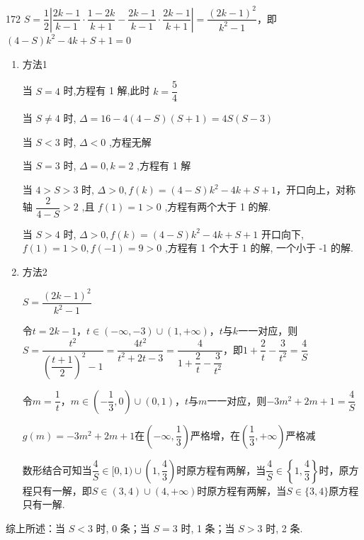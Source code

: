 \begin{enumerate}
\begin{jieda}
\begin{enumerate}
\begin{dingautolist}{172}
                $S = \dfrac{1}{2} \left|\dfrac{{2k} - 1}{k - 1} \cdot \dfrac{1 - {2k}}{k + 1} - \dfrac{{2k} - 1}{k - 1} \cdot \dfrac{{2k} - 1}{k + 1}\right| = \dfrac{{\left( 2k - 1\right) }^{2}}{{k}^{2} - 1}$，即 $\left( {4 - S}\right) {k}^{2} - {4k} + S + 1 = 0$
                \begin{enumerate}[1.]
                    \item 方法1 
                    
                    当 $S = 4$ 时,方程有 1 解,此时 $k = \dfrac{5}{4}$
                    
                    当 $S \neq  4$ 时, $\Delta  = {16} - 4\left( {4 - S}\right) \left( {S + 1}\right)  = {4S}\left( {S - 3}\right)$ 
                    
                    当 $S < 3$ 时, $\Delta  < 0$ ,方程无解
                    
                    当 $S = 3$ 时, $\Delta  = 0,k = 2$ ,方程有 1 解
                    
                    当 $4 > S > 3$ 时, $\Delta  > 0,f\left( k\right)  = \left( {4 - S}\right) {k}^{2} - {4k} + S + 1$，开口向上，对称轴 $\dfrac{2}{4 - S} > 2$ ,且 $f\left( 1\right)  = 1 > 0$ ,方程有两个大于 1 的解.
                    
                    当 $S > 4$ 时, $\Delta  > 0,f\left( k\right)  = \left( {4 - S}\right) {k}^{2} - {4k} + S + 1$ 开口向下, $f\left( 1\right)  = 1 > 0,f\left( {-1}\right)  = 9 > 0$ ,方程有 1 个大于 1 的解, 一个小于 -1 的解.
                    \item 方法2

                    $S = \dfrac{(2k-1)^2}{k^2-1}$
                    
                    令$t = 2k-1$，$t \in (-\infty, -3) \cup (1, +\infty)$，$t$与$k$一一对应，则$S = \dfrac{t^2}{\left(\dfrac{t+1}{2}\right)^2-1} = \dfrac{4t^2}{t^2+2t-3} = \dfrac{4}{1+\dfrac{2}{t}-\dfrac{3}{t^2}}$，即$1+\dfrac{2}{t}-\dfrac{3}{t^2} = \dfrac{4}{S}$

                    令$m = \dfrac{1}{t}$，$m \in \left(-\dfrac{1}{3}, 0\right) \cup (0, 1)$，$t$与$m$一一对应，则$-3m^2+2m+1 = \dfrac{4}{S}$
                    
                    $g(m) = -3m^2+2m+1$在$\left(-\infty, \dfrac{1}{3}\right)$严格增，在$\left(\dfrac{1}{3}, +\infty\right)$严格减
                    
                    数形结合可知当$\dfrac{4}{S} \in [0, 1)\cup \left(1, \dfrac{4}{3}\right)$时原方程有两解，当$\dfrac{4}{S} \in \left\{1, \dfrac{4}{3}\right\}$时，原方程只有一解，即$S \in (3, 4) \cup (4, +\infty)$时原方程有两解，当$S \in \{3,4\}$原方程只有一解.
                \end{enumerate}
            \end{dingautolist}

            综上所述：当 $S < 3$ 时, 0 条；当 $S = 3$ 时, 1 条；当 $S > 3$ 时, 2 条.
        \end{enumerate}
    \end{jieda}
\end{enumerate}

